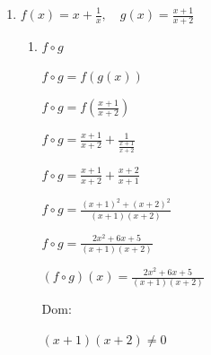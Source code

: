 \documentclass{article}
\begin{document}
\begin{enumerate}
\begin{enumerate}
\begin{enumerate}
                \( x \in [0, \infty) \land \sqrt{x} \leq 2 \)
                
                \( x \in [0, \infty) \land x \leq 4 \)
                
                \( x \in [0, \infty) \land x \in (-\infty, 4] \)
                
                \( x \in (-\infty, 4] \cap [0, \infty) \)
                
                \( x \in [0, 4] \)
                \vspace{\baselineskip}
                
                Entonces:
                
                \(Dom_{f \circ g} = \{x \in \mathbb{R} \, | \, 0 \leq x \leq 4\} \)
                
                \(Dom_{f \circ g} = [0, 4] \)
            \end{enumerate}
            \vspace{\baselineskip}
            
        \item[e)] \(f(x) = x + \frac{1}{x}, \quad g(x) = \frac{x+1}{x+2}\)
            \begin{enumerate}
                \item[1.] \(f \circ g\)

                \( f \circ g = f(g(x)) \)
                
                \( f \circ g = f\left(\frac{x+1}{x+2}\right) \)
                
                \( f \circ g = \frac{x+1}{x+2} + \frac{1}{\frac{x+1}{x+2}} \)
                
                \( f \circ g = \frac{x+1}{x+2} + \frac{x+2}{x+1} \)
                
                \( f \circ g = \frac{(x+1)^2 + (x+2)^2}{(x+1)(x+2)} \)
                
                \( f \circ g = \frac{2x^2 + 6x + 5}{(x+1)(x+2)} \)
                \vspace{\baselineskip}
                
                \( (f \circ g)(x) = \frac{2x^2 + 6x + 5}{(x+1)(x+2)} \)
                \vspace{\baselineskip}
                
                Dom:
                
                \((x+1)(x+2) \neq 0 \)
                

\end{enumerate}
\end{enumerate}
\end{enumerate}
\end{document}
